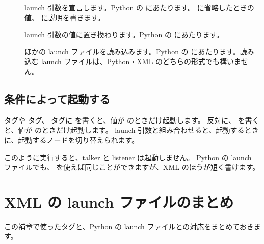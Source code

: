 
\begin{description}
  \item[] launch 引数を宣言します。Python の  にあたります。 に省略したときの値、 に説明を書きます。
  \item[] launch 引数の値に置き換わります。Python の  にあたります。
  \item[] ほかの launch ファイルを読み込みます。Python の  にあたります。読み込む launch ファイルは、Python・XML のどちらの形式でも構いません。
\end{description}

\subsection{条件によって起動する}

 タグや  タグ、 タグに  を書くと、値が  のときだけ起動します。
反対に、 を書くと、値が  のときだけ起動します。
launch 引数と組み合わせると、起動するときに、起動するノードを切り替えられます。


このように実行すると、talker と listener は起動しません。
Python の launch ファイルでも、 を使えば同じことができますが、XML のほうが短く書けます。

\section{XML の launch ファイルのまとめ}
\label{sec:launch-xml-summary}

この補章で使ったタグと、Python の launch ファイルとの対応をまとめておきます。

